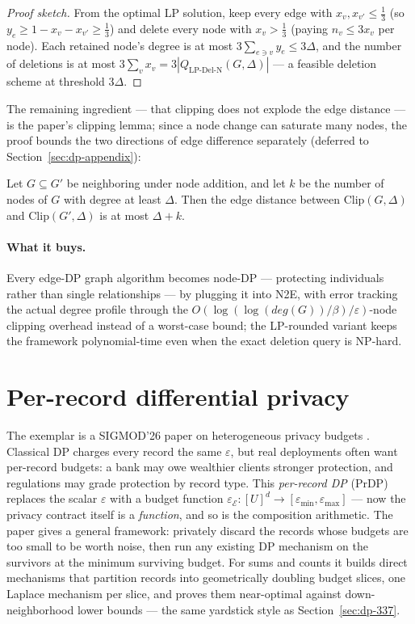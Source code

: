 \begin{proof}[Proof sketch]
From the optimal LP solution, keep every edge with $x_v, x_{v'} \le \tfrac13$ (so
$y_e \ge 1 - x_v - x_{v'} \ge \tfrac13$) and delete every node with $x_v > \tfrac13$
(paying $n_v \le 3x_v$ per node). Each retained node's degree is at most
$3\sum_{e \ni v} y_e \le 3\Delta$, and the number of deletions is at most
$3\sum_v x_v = 3|Q_{\mathrm{LP\text{-}Del\text{-}N}}(G,\Delta)|$ --- a feasible
deletion scheme at threshold $3\Delta$.
\end{proof}

The remaining ingredient --- that clipping does not explode the edge distance --- is the
paper's clipping lemma; since a node change can saturate many nodes, the proof bounds
the two directions of edge difference separately (deferred to
Section~\ref{sec:dp-appendix}):

\begin{lemma}
\label{lem:dp-337-clip}
Let $G \subseteq G'$ be neighboring under node addition, and let $k$ be the number of
nodes of $G$ with degree at least $\Delta$. Then the edge distance between
$\mathrm{Clip}(G,\Delta)$ and $\mathrm{Clip}(G',\Delta)$ is at most $\Delta + k$. \eop
\end{lemma}

\paragraph{What it buys.}
Every edge-DP graph algorithm becomes node-DP --- protecting individuals rather than
single relationships --- by plugging it into N2E, with error tracking the actual
degree profile through the $O(\log(\log(\mathit{deg}(G))/\beta)/\varepsilon)$-node
clipping overhead instead of a worst-case bound; the LP-rounded variant keeps the
framework polynomial-time even when the exact deletion query is NP-hard.

\section{Per-record differential privacy}
\label{sec:dp-263}

The exemplar is a SIGMOD'26 paper on heterogeneous privacy budgets \citep{sigmod26-263}.
Classical DP charges every record the same $\varepsilon$, but real deployments often
want per-record budgets: a bank may owe wealthier clients stronger protection, and
regulations may grade protection by record type. This \emph{per-record DP} (PrDP)
replaces the scalar $\varepsilon$ with a budget function
$\varepsilon_\mathcal{E}\colon [U]^d \to [\varepsilon_{\min}, \varepsilon_{\max}]$ ---
now the privacy contract itself is a \emph{function}, and so is the composition
arithmetic. The paper gives a general framework: privately discard the records whose
budgets are too small to be worth noise, then run any existing DP mechanism on the
survivors at the minimum surviving budget. For sums and counts it builds direct
mechanisms that partition records into geometrically doubling budget slices, one
Laplace mechanism per slice, and proves them near-optimal against down-neighborhood
lower bounds --- the same yardstick style as Section~\ref{sec:dp-337}.

